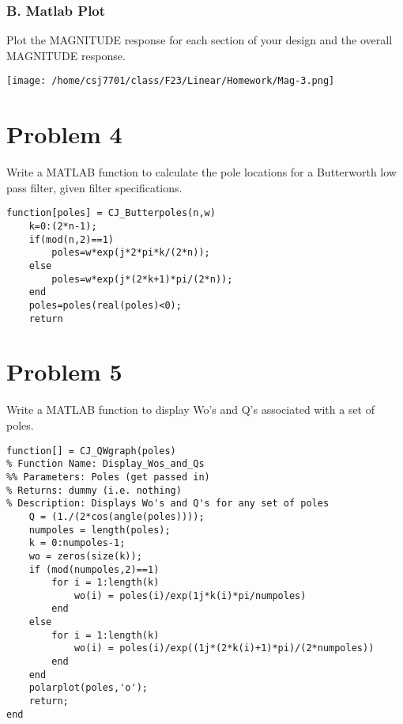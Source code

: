\documentclass[11pt]{article}
\begin{document}
\subsubsection{B. Matlab Plot}
\label{sec:orga9402b8}
Plot the MAGNITUDE response for each section of your design and the overall MAGNITUDE response.
\begin{center}
\texttt{[image: /home/csj7701/class/F23/Linear/Homework/Mag-3.png]}
\end{center}
\section{Problem 4}
\label{sec:org0e622ef}
Write a MATLAB function to calculate the pole locations for a Butterworth low pass filter, given filter specifications.
\begin{verbatim}
function[poles] = CJ_Butterpoles(n,w)
    k=0:(2*n-1);
    if(mod(n,2)==1)
        poles=w*exp(j*2*pi*k/(2*n));
    else
        poles=w*exp(j*(2*k+1)*pi/(2*n));
    end
    poles=poles(real(poles)<0);
    return
\end{verbatim}
\section{Problem 5}
\label{sec:orge2e17a8}
Write a MATLAB function to display Wo’s and Q’s associated with a set of poles.
\begin{verbatim}
function[] = CJ_QWgraph(poles)
% Function Name: Display_Wos_and_Qs
%% Parameters: Poles (get passed in)
% Returns: dummy (i.e. nothing)
% Description: Displays Wo's and Q's for any set of poles
    Q = (1./(2*cos(angle(poles))));
    numpoles = length(poles);
    k = 0:numpoles-1;
    wo = zeros(size(k));
    if (mod(numpoles,2)==1)
        for i = 1:length(k)
            wo(i) = poles(i)/exp(1j*k(i)*pi/numpoles)
        end
    else
        for i = 1:length(k)
            wo(i) = poles(i)/exp((1j*(2*k(i)+1)*pi)/(2*numpoles))
        end
    end
    polarplot(poles,'o');
    return;
end
\end{verbatim}
\end{document}
